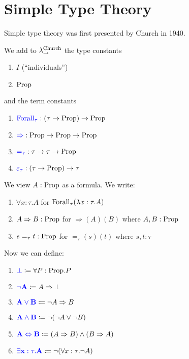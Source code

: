 \section{Simple Type Theory}

Simple type theory was first presented by Church in 1940. 

\begin{boxdefi}
    We add to $\lambda_{\to}^{\textnormal{Church}}$ the type constants 
    \begin{enumerate}
        \item \alert{$I$} (``\alert{individuals}'')
        \item \alert{$\mathrm{Prop}$}
    \end{enumerate}
    and the term constants 
    \begin{enumerate}
        \item $\alert{\forallterm{\tau}} : (\tau \to \proptype) \to \proptype$
        \item $\alert{{\Rightarrow}} : \proptype \to \proptype \to \proptype$
        \item $\alert{=_\tau} : \tau \to \tau \to \proptype$
        \item $\alert{\varepsilon_\tau} : (\tau \to \proptype) \to \tau$
    \end{enumerate}
    We view $A : \mathrm{Prop}$ as a formula. 
    We write: 
    \begin{enumerate}
        \item $\forall x : \tau. A$ for $\mathrm{Forall}_{\tau}(\lambda x : \tau.A)$
        \item $A \Rightarrow B : \mathrm{Prop}$ for ${\Rightarrow} (A)(B)$ where $A, B : \mathrm{Prop}$
        \item $s =_\tau t : \mathrm{Prop}$ for ${=_\tau}(s)(t)$ where $s, t : \tau$
    \end{enumerate}
    Now we can define: 
    \begin{enumerate}
        \item $\alert{\bot} \coloneq \forall P : \proptype. P$
        \item $\alert{\neg A} \coloneq A \Rightarrow \bot$
        \item $\alert{A \vee B} \coloneq \neg A \Rightarrow B$
        \item $\alert{A \wedge B} \coloneq \neg (\neg A \vee \neg B)$
        \item $\alert{A \Leftrightarrow B} \coloneq (A \Rightarrow B) \wedge (B \Rightarrow A)$
        \item $\alert{\exists x : \tau. A} \coloneq \neg (\forall x : \tau. \neg A)$
    \end{enumerate}
\end{boxdefi}

